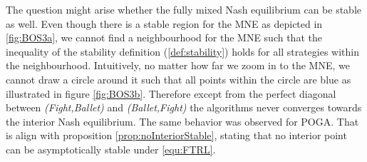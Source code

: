 The question might arise whether the fully mixed Nash equilibrium can be stable as well. Even though there is a stable region for the MNE as depicted in \ref{fig:BOS3a}, we cannot find a neighbourhood for the MNE such that the inequality of the stability definition (\ref{def:stability}) holds for all strategies within the neighbourhood. Intuitively, no matter how far we zoom in to the MNE, we cannot draw a circle around it such that all points within the circle are blue as illustrated in figure \ref{fig:BOS3b}. Therefore except from the perfect diagonal between \textit{(Fight,Ballet)} and \textit{(Ballet,Fight)} the algorithms never converges towards the interior Nash equilibrium. The same behavior was observed for POGA. That is align with proposition \ref{prop:noInteriorStable}, stating that no interior point can be asymptotically stable under \ref{equ:FTRL}. 

